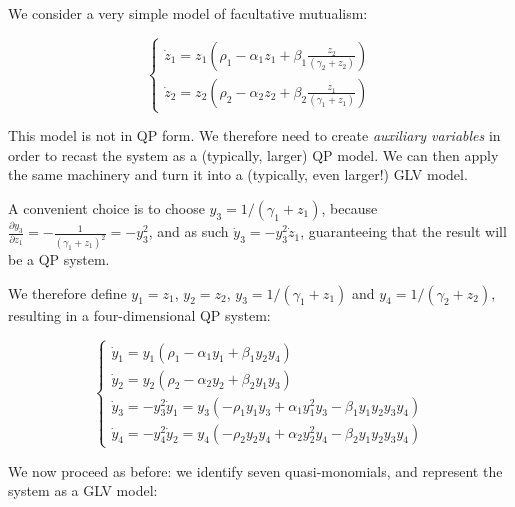 \documentclass{article}
\begin{document}
We consider a very simple model of facultative mutualism:

\begin{equation}
\begin{cases}
\dot{z}_1 = z_1 \left(\rho_1 - \alpha_1 z_1 + \beta_1 \frac{z_2}{(\gamma_2 + z_2)} \right)\\
\dot{z}_2 = z_2 \left(\rho_2 - \alpha_2 z_2 + \beta_2 \frac{z_1}{(\gamma_1 + z_1)} \right)
\end{cases}
\end{equation}

This model is not in QP form. We therefore need to create
\emph{auxiliary variables} in order to recast the system as a
(typically, larger) QP model. We can then apply the same machinery and
turn it into a (typically, even larger!) GLV model.

A convenient choice is to choose \(y_3 = 1 / (\gamma_1 + z_1)\), because
\(\frac{\partial y_3}{\partial z_1} = - \frac{1}{(\gamma_1 + z_1)^2} = -y_3^2\),
and as such \(\dot{y}_3 = -y_3^2 \dot{z}_1\), guaranteeing that the
result will be a QP system.

We therefore define \(y_1 = z_1\), \(y_2 = z_2\),
\(y_3 = 1/(\gamma_1 + z_1)\) and \(y_4 = 1 / (\gamma_2 + z_2)\),
resulting in a four-dimensional QP system:

\begin{equation}
\begin{cases}
\dot{y}_1 = y_1 \left(\rho_1 - \alpha_1 y_1 + \beta_1 y_2 y_4 \right)\\
\dot{y}_2 = y_2 \left(\rho_2 - \alpha_2 y_2 + \beta_2 y_1 y_3 \right)\\
\dot{y}_3 = -y_3^2 \dot{y}_1 = y_3 (-\rho_1 y_1 y_3 + \alpha_1 y_1^2 y_3 - \beta_1 y_1 y_2 y_3 y_4)\\
\dot{y}_4 = -y_4^2 \dot{y}_2 = y_4 (-\rho_2 y_2 y_4 + \alpha_2 y_2^2 y_4 - \beta_2 y_1 y_2 y_3 y_4)
\end{cases}
\end{equation}

We now proceed as before: we identify seven quasi-monomials, and
represent the system as a GLV model:
\end{document}
